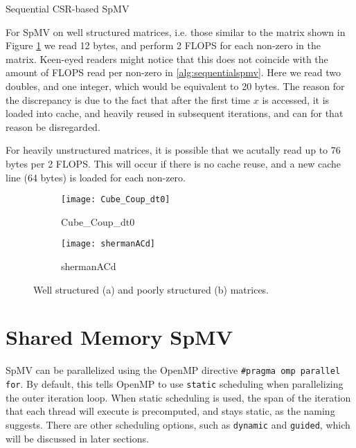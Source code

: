 \begin{algorithm}[htbp]
    \caption{Sequential CSR-based SpMV}
    \SetAlgoVlined

\end{algorithm}
\label{alg:sequentialspmv}
\medskip

For SpMV on well structured matrices, i.e. those similar to the matrix shown in Figure \ref{fig:Cube_Coup_dt0}  we read 12 bytes, and perform 2 FLOPS for each non-zero in the matrix. Keen-eyed readers might notice that this does not coincide with the amount of FLOPS read per non-zero in \autoref{alg:sequentialspmv}. Here we read two doubles, and one integer, which would be equivalent to 20 bytes. The reason for the discrepancy is due to the fact that after the first time \(x\) is accessed, it is loaded into cache, and heavily reused in subsequent iterations, and can for that reason be disregarded.

For heavily unstructured matrices, it is possible that we acutally read up to 76 bytes per 2 FLOPS. This will occur if there is no cache reuse, and a new cache line (64 bytes) is loaded for each non-zero.


\begin{figure}[H]
    \centering
    \begin{subfigure}[t]{0.45\textwidth}
        \centering
        \texttt{[image: Cube\_Coup\_dt0]}
        \caption{Cube\_Coup\_dt0}
    \end{subfigure}
    \hfill
    \begin{subfigure}[t]{0.45\textwidth}
        \centering
        \texttt{[image: shermanACd]}
        \caption{shermanACd}
    \end{subfigure}
    \caption{Well structured (a) and poorly structured (b) matrices.}
    \label{fig:Cube_Coup_dt0}
\end{figure}

\section{Shared Memory SpMV}
SpMV can be parallelized using the OpenMP directive \texttt{\#pragma omp parallel for}. By default, this tells OpenMP to use \texttt{static} scheduling when parallelizing the outer iteration loop. When static scheduling is used, the span of the iteration that each thread will execute is precomputed, and stays static, as the naming suggests. There are other scheduling options, such as \texttt{dynamic} and \texttt{guided}, which will be discussed in later sections.
\medskip

